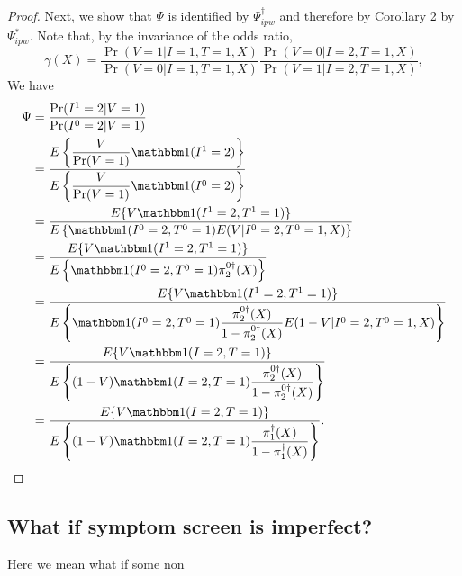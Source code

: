 \begin{appendix}
\begin{proof}
        Next, we show that $\Psi$ is identified by $\Psi^\dagger_{ipw}$ and therefore by Corollary 2 by $\Psi^*_{ipw}$. Note that, by the invariance of the odds ratio, 
        \begin{equation*}
            \gamma(X) = \dfrac{\Pr(V = 1 | I = 1, T = 1, X)}{\Pr(V = 0 | I = 1, T = 1, X)} \dfrac{\Pr(V = 0 | I = 2, T = 1, X)}{\Pr(V = 1 | I = 2, T = 1, X)},
        \end{equation*}
        We have
        \begin{align*}
        \Psi &= \dfrac{\Pr(I^1=2|V=1)}{\Pr(I^0=2|V=1)} \\
        &= \dfrac{E\left\{\dfrac{V}{\Pr(V=1)} \mathbbm 1 (I^1 = 2)\right\}}{E\left\{\dfrac{V}{\Pr(V=1)}\mathbbm 1 (I^0 = 2)\right\}} \\
        &= \dfrac{E\{V \mathbbm 1 (I^1 = 2, T^1 = 1)\}}{E\left\{\mathbbm 1 (I^0 = 2, T^0 = 1) E(V | I^0 = 2, T^0 = 1, X)\right\}} \\
        &= \dfrac{E\{V \mathbbm 1 (I^1 = 2, T^1 = 1)\}}{E\left\{\mathbbm 1 (I^0 = 2, T^0 = 1) \pi^{0\dagger}_2(X)\right\}} \\
        &= \dfrac{E\{V \mathbbm 1 (I^1 = 2, T^1 = 1)\}}{E\left\{\mathbbm 1 (I^0 = 2, T^0 = 1) \dfrac{\pi^{0\dagger}_2(X)}{1-\pi^{0\dagger}_2(X)}E(1-V|I^0 = 2, T^0 = 1, X)\right\}} \\
        &= \dfrac{E\{V \mathbbm 1 (I = 2, T = 1)\}}{E\left\{(1 - V)\mathbbm 1 (I = 2, T = 1) \dfrac{\pi^{0\dagger}_2(X)}{1-\pi^{0\dagger}_2(X)}\right\}} \\
        &= \dfrac{E\{V \mathbbm 1 (I = 2, T = 1)\}}{E\left\{(1 - V)\mathbbm 1 (I = 2, T = 1) \dfrac{\pi^\dagger_1(X)}{1-\pi^\dagger_1(X)}\right\}}.
    \end{align*}
    \end{proof}

\newpage
\subsection{What if symptom screen is imperfect?}
Here we mean what if some non
\newpage


\end{appendix}
